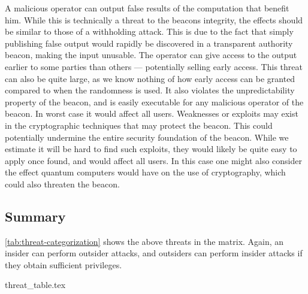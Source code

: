  A malicious operator can output false results of the computation that benefit him. While this is technically a threat to the beacons integrity, the effects should be similar to those of a withholding attack. This is due to the fact that simply publishing false output would rapidly be discovered in a transparent authority beacon, making the input unusable.
 The operator can give access to the output earlier to some parties than others --- potentially selling early access. This threat can also be quite large, as we know nothing of how early access can be granted compared to when the randomness is used. It also violates the unpredictability property of the beacon, and is easily executable for any malicious operator of the beacon. In worst case it would affect all users.
 Weaknesses or exploits may exist in the cryptographic techniques that may protect the beacon. This could potentially undermine the entire security foundation of the beacon. While we estimate it will be hard to find such exploits, they would likely be quite easy to apply once found, and would affect all users. In this case one might also consider the effect quantum computers would have on the use of cryptography, which could also threaten the beacon.

\subsection{Summary}

\cref{tab:threat-categorization} shows the above threats in the matrix. Again, an insider can perform outsider attacks, and outsiders can perform insider attacks if they obtain sufficient privileges.

{threat_table.tex}
